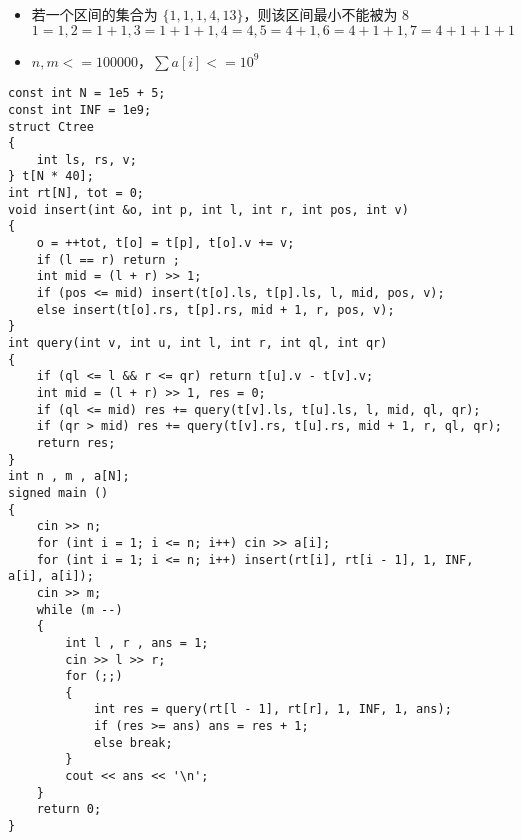 \documentclass[E:/GsjzTle/main/main.tex]{subfiles}
\begin{document}
\begin{itemize}
\item
  若一个区间的集合为 \(\{1,1,1,4,13\}\)，则该区间最小不能被为 \(8\)\\
  \(1 = 1,2=1+1,3=1+1+1,4=4,5=4+1,6=4+1+1,7=4+1+1+1\)
\item
  \(n,m <= 100000\)，\(∑a[i] <= 10^9\)
\end{itemize}

\begin{lstlisting}
const int N = 1e5 + 5;
const int INF = 1e9;
struct Ctree
{
	int ls, rs, v;
} t[N * 40];
int rt[N], tot = 0;
void insert(int &o, int p, int l, int r, int pos, int v)
{
	o = ++tot, t[o] = t[p], t[o].v += v;
	if (l == r) return ;
	int mid = (l + r) >> 1;
	if (pos <= mid) insert(t[o].ls, t[p].ls, l, mid, pos, v);
	else insert(t[o].rs, t[p].rs, mid + 1, r, pos, v);
}
int query(int v, int u, int l, int r, int ql, int qr)
{
	if (ql <= l && r <= qr) return t[u].v - t[v].v;
	int mid = (l + r) >> 1, res = 0;
	if (ql <= mid) res += query(t[v].ls, t[u].ls, l, mid, ql, qr);
	if (qr > mid) res += query(t[v].rs, t[u].rs, mid + 1, r, ql, qr);
	return res;
}
int n , m , a[N];
signed main ()
{
	cin >> n;
	for (int i = 1; i <= n; i++) cin >> a[i];
	for (int i = 1; i <= n; i++) insert(rt[i], rt[i - 1], 1, INF, a[i], a[i]);
	cin >> m;
	while (m --)
	{
		int l , r , ans = 1;
		cin >> l >> r;
		for (;;)
		{
			int res = query(rt[l - 1], rt[r], 1, INF, 1, ans);
			if (res >= ans) ans = res + 1;
			else break;
		}
		cout << ans << '\n';
	}
	return 0;
}
\end{lstlisting}
\end{document}

